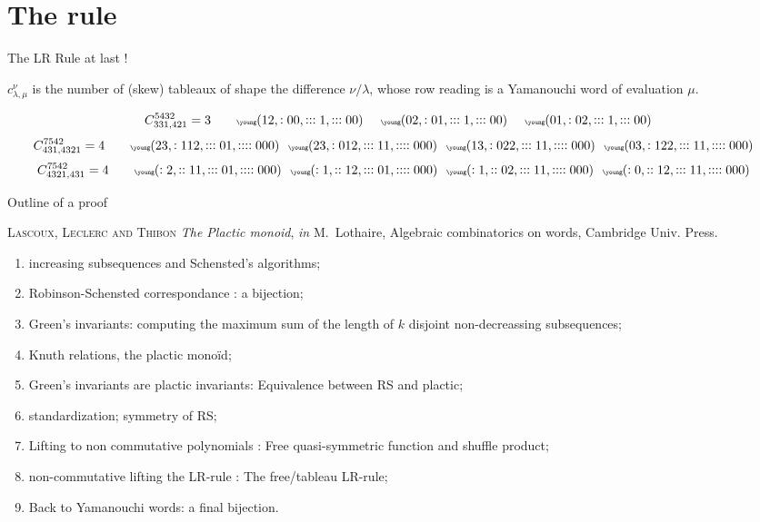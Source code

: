 \documentclass[compress,11pt]{beamer}
\begin{document}
\section{The rule}

\begin{frame}{The LR Rule at last !}

  \begin{THEO}
    $c_{\lambda, \mu}^{\nu}$ is the number of (skew) tableaux of shape the
    difference $\nu/\lambda$, whose row reading is a Yamanouchi word of
    evaluation $\mu$.
  \end{THEO}
  \[
  C_{331,421}^{5432} = 3
  \qquad \tiny
  \young(12,:00,:::1,:::00)\qquad
  \young(02,:01,:::1,:::00)\qquad
  \young(01,:02,:::1,:::00)
  \]
  \[
  C_{431,4321}^{7542} = 4
  \qquad \tiny
  \young(23,:112,:::01,::::000)\quad
  \young(23,:012,:::11,::::000)\quad
  \young(13,:022,:::11,::::000)\quad
  \young(03,:122,:::11,::::000)\quad
  \]
  \[
  C_{4321,431}^{7542} = 4
  \qquad \tiny
  \young(:2,::11,:::01,::::000)\quad
  \young(:1,::12,:::01,::::000)\quad
  \young(:1,::02,:::11,::::000)\quad
  \young(:0,::12,:::11,::::000)\quad
  \]

\end{frame}

\begin{frame}{Outline of a proof}

  \textsc{\sc Lascoux, Leclerc and Thibon} \textit{The Plactic monoid},
    {\it in} M.~Lothaire, Algebraic combinatorics on words,
    Cambridge Univ. Press.

  \begin{enumerate}
  \item increasing subsequences and Schensted's algorithms;
  \item Robinson-Schensted correspondance : a bijection;
  \item Green's invariants: computing the maximum sum of the length of $k$ disjoint
    non-decreassing subsequences;
  \item Knuth relations, the plactic monoïd;
  \item Green's invariants are plactic invariants: Equivalence between RS and plactic;
  \item standardization; symmetry of RS;
  \item Lifting to non commutative polynomials : Free quasi-symmetric function
    and shuffle product;
  \item non-commutative lifting the LR-rule : The free/tableau LR-rule;
  \item Back to Yamanouchi words: a final bijection.
  \end{enumerate}
\end{frame}
\end{document}
